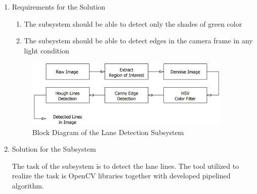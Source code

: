 \documentclass[a4paper,12pt]{article}
\begin{document}
\begin{enumerate}

\item {Requirements for the Solution}






\begin{enumerate}

\item The subsystem should be able to detect only the shades of green color

\item The subsystem should be able to detect edges in the camera frame in any light condition


\end{enumerate}




\begin{figure}[h]

\includegraphics[width=0.93\textwidth,center]{images/vModels/laneDetection_subsystem}

\caption{Block Diagram of the Lane Detection Subsystem}\label{fig:lane_detection_subsystem}

\end{figure}




\item {Solution for the Subsystem}


The task of the subsystem is to detect the lane lines. The tool utilized to realize the task is OpenCV libraries together with developed pipelined algorithm.


\end{enumerate}
\end{document}
